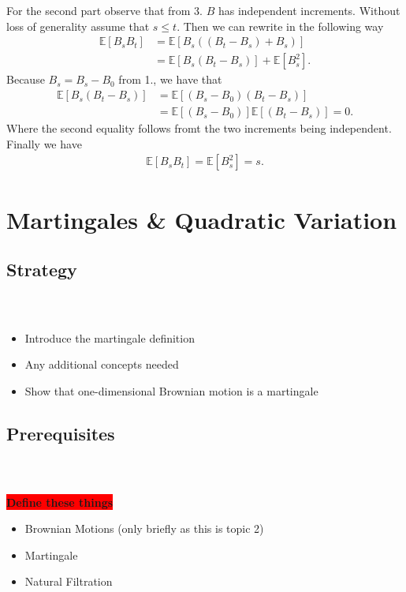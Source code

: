 \documentclass{beamer}
\numberwithin{equation}{section}
\newcommand{\task}[1]{
    \begin{center}
        \colorbox{red}{
            \textsf{
                \textbf{#1}
            }
        }
    \end{center}
}
\newenvironment{frame2}{\begin{frame}\frametitle{{\normalsize \secname} \\ {\large \subsecname}}}{\end{frame}}
\begin{document}
\begin{frame2}
    For the second part observe that from 3. $B$ has independent increments.
    Without loss of generality assume that $s \leq t$.
    Then we can rewrite in the following way
    \begin{align}
        \mathbb{E}[B_sB_t] &= \mathbb{E}[B_s((B_t - B_s) + B_s)] \\
        &= \mathbb{E}[B_s(B_t - B_s)] + \mathbb{E}[B_s^2].
    \end{align}
    Because $B_s = B_s - B_0$ from 1., we have that
    \begin{align}
        \mathbb{E}[B_s(B_t - B_s)] &= \mathbb{E}[(B_s - B_0)(B_t - B_s)] \\
        &= \mathbb{E}[(B_s - B_0)]\mathbb{E}[(B_t - B_s)] = 0.
    \end{align} 
    Where the second equality follows fromt the two increments being independent.
    Finally we have
    \begin{align}
        \mathbb{E}[B_sB_t] = \mathbb{E}[B_s^2] = s.
    \end{align}
\end{frame2}

\section{Martingales \& Quadratic Variation}

\subsection{Strategy}
\begin{frame2}
    \begin{itemize}
        \item Introduce the martingale definition
        \item Any additional concepts needed
        \item Show that one-dimensional Brownian motion is a martingale
    \end{itemize}
 \end{frame2}

\subsection{Prerequisites}

\begin{frame2}
    \task{Define these things}
    \begin{itemize}
        \item Brownian Motions (only briefly as this is topic 2)
        \item Martingale
        \item Natural Filtration
    \end{itemize}
\end{frame2}
\end{document}

